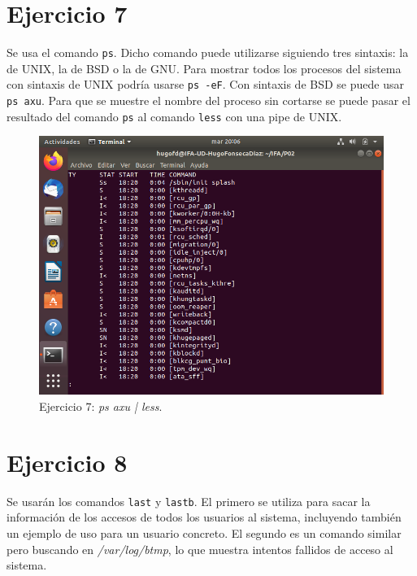 \documentclass[11pt]{article}
\begin{document}
\section{Ejercicio 7}
Se usa el comando \verb|ps|. Dicho comando puede utilizarse siguiendo tres sintaxis: la de UNIX, la de BSD o la de GNU. Para mostrar todos los procesos del sistema con sintaxis de UNIX podría usarse \verb|ps -eF|. Con sintaxis de BSD se puede usar \verb|ps axu|. Para que se muestre el nombre del proceso sin cortarse se puede pasar el resultado del comando \verb|ps| al comando \verb|less| con una pipe de UNIX.

\begin{figure}[H]
    \caption{Ejercicio 7: \textit{ps axu | less}.}
  \centering
  \includegraphics{e7.png}
\end{figure}

\section{Ejercicio 8}
Se usarán los comandos \verb|last| y \verb|lastb|. El primero se utiliza para sacar la información de los accesos de todos los usuarios al sistema, incluyendo también un ejemplo de uso para un usuario concreto. El segundo es un comando similar pero buscando en \textit{/var/log/btmp}, lo que muestra intentos fallidos de acceso al sistema.
\end{document}
